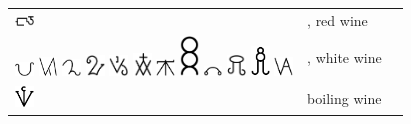 \documentclass[british,final,landscape]{scrartcl}
\begin{document}
\begin{refsection}
\begin{supertabular}{p{0.3\textwidth}p{0.34\textwidth}p{0.34\textwidth}}
   \includegraphics[width=5mm]{Mixtures/RedWine} & , red wine & \\
   \includegraphics[width=5mm]{Mixtures/WhiteWine} \includegraphics[width=5mm]{Mixtures/WhiteWine2} \includegraphics[width=5mm]{Mixtures/WhiteWine3} \includegraphics[width=5mm]{Mixtures/WhiteWine4} \includegraphics[width=5mm]{Mixtures/WhiteWine5} \includegraphics[width=5mm]{Mixtures/WhiteWine6} \includegraphics[width=5mm]{Mixtures/WhiteWine7} \includegraphics[width=5mm]{Mixtures/WhiteWine8} \includegraphics[width=5mm]{Mixtures/WhiteWine9} \includegraphics[width=5mm]{Mixtures/WhiteWine10} \includegraphics[width=5mm]{Mixtures/WhiteWine11} \includegraphics[width=5mm]{Mixtures/WhiteWine12} & , white wine & \\
   \includegraphics[width=5mm]{Mixtures/BoilingWine} & boiling wine & \\

\end{supertabular}
\end{refsection}
\end{document}
